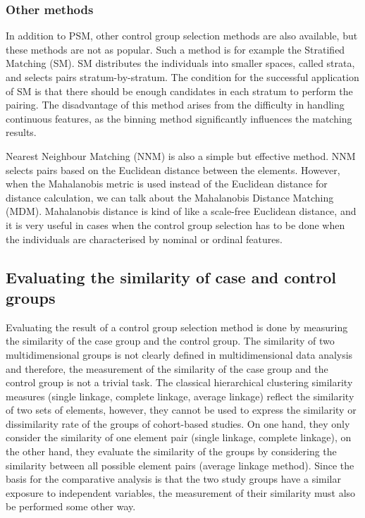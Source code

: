 \subsubsection{Other methods}
\label{sec:other_methods}

In addition to PSM, other control group selection methods are also available, but these methods are not as popular. Such a method is for example the Stratified Matching (SM). SM distributes the individuals into smaller spaces, called strata, and selects pairs stratum-by-stratum. The condition for the successful application of SM is that there should be enough candidates in each stratum to perform the pairing. The disadvantage of this method arises from the difficulty in handling continuous features, as the binning method significantly influences the matching results.

Nearest Neighbour Matching (NNM) is also a simple but effective method. NNM selects pairs based on the Euclidean distance between the elements. However, when the Mahalanobis metric is used instead of the Euclidean distance for distance calculation, we can talk about the Mahalanobis Distance Matching (MDM). Mahalanobis distance is kind of like a scale-free Euclidean distance, and it is very useful in cases when the control group selection has to be done when the individuals are characterised by nominal or ordinal features.

\subsection{Evaluating the similarity of case and control groups}
\label{sec:evaluating}

Evaluating the result of a control group selection method is done by measuring the similarity of the case group and the control group. The similarity of two multidimensional groups is not clearly defined in multidimensional data analysis and therefore, the measurement of the similarity of the case group and the control group is not a trivial task. The classical hierarchical clustering similarity measures (single linkage, complete linkage, average linkage) \cite{jain1988algorithms} reflect the similarity of two sets of elements, however, they cannot be used to express the similarity or dissimilarity rate of the groups of cohort-based studies. On one hand, they only consider the similarity of one element pair (single linkage, complete linkage), on the other hand, they evaluate the similarity of the groups by considering the similarity between all possible element pairs (average linkage method). Since the basis for the comparative analysis is that the two study groups have a similar exposure to independent variables, the measurement of their similarity must also be performed some other way.

